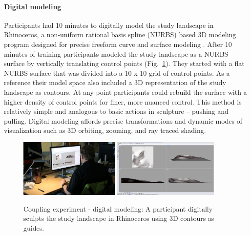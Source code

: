 \documentclass[prodmode,acmtochi]{acmsmall} %
\begin{document}
\paragraph{Digital modeling}
Participants had 10 minutes to digitally model the study landscape in Rhinoceros, 
a non-uniform rational basis spline (NURBS) based 3D modeling program
designed for precise freeform curve and surface modeling \cite{Rhino}.
After 10 minutes of training
participants modeled the study landscape as a NURBS surface 
by vertically translating control points (Fig.~\ref{fig:rhino}). 
They started with a flat NURBS surface that was divided into a 10 x 10 grid of control points.
As a reference their model space also included a 3D representation of the study landscape as contours. 
At any point participants could rebuild the surface with a higher density of control points for finer, more nuanced control. 
This method is relatively simple and 
analogous to basic actions in sculpture -- pushing and pulling. 
Digital modeling affords precise transformations and
dynamic modes of visualization such as 
3D orbiting, zooming, and ray traced shading. 

\begin{figure}
\begin{center}
	\includegraphics[height=108px]{images/experiments/art_rhino.jpg}
	\includegraphics[height=108px]{images/experiments/rhino.png}
	\caption{Coupling experiment - digital modeling:
	A participant digitally sculpts the study landscape in Rhinoceros
	using 3D contours as guides.}
	\label{fig:rhino}
\end{center}
\end{figure}
\end{document}
